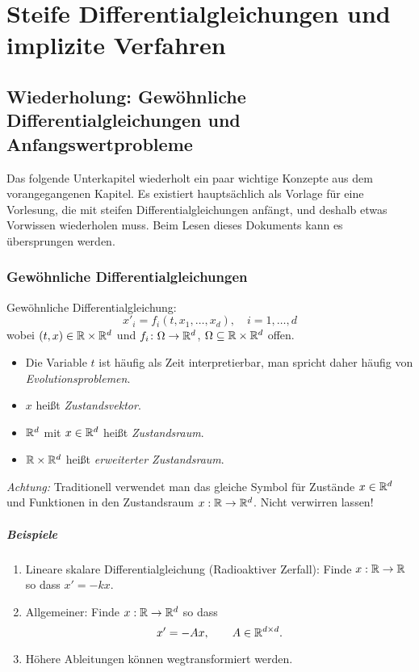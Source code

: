 \chapter{Steife Differentialgleichungen und implizite Verfahren}

\section{Wiederholung: Gewöhnliche Differentialgleichungen und Anfangswertprobleme}

Das folgende Unterkapitel wiederholt ein paar wichtige Konzepte aus dem vorangegangenen
Kapitel.  Es existiert hauptsächlich als Vorlage für eine Vorlesung, die mit steifen
Differentialgleichungen anfängt, und deshalb etwas Vorwissen wiederholen muss.
Beim Lesen dieses Dokuments kann es übersprungen werden.

\bigskip

\subsection{Gewöhnliche Differentialgleichungen}

Gewöhnliche Differentialgleichung:
\begin{equation*}
x'_i=f_i (t,x_1,\ldots,x_d ), \quad i=1,\ldots,d
\end{equation*}
wobei $(t,x) \in \mathbb R \times \mathbb R^d$ und $f_i \colon \Omega \to \mathbb R^d$, $\Omega \subseteq \mathbb R \times \mathbb R^d$ offen.

\begin{itemize}[nolistsep]
	\item Die Variable $t$ ist häufig als Zeit interpretierbar, man spricht daher häufig von \emph{Evolutionsproblemen}.
	\item $x$ heißt \emph{Zustandsvektor}.
	\item $\mathbb R^d$ mit $x \in \mathbb R^d$ heißt \emph{Zustandsraum}.
	\item $\mathbb R \times \mathbb R^d$ heißt \emph{erweiterter Zustandsraum}.
\end{itemize}

\emph{Achtung:} Traditionell verwendet man das gleiche Symbol für Zustände $x \in \mathbb R^d$ und Funktionen in den Zustandsraum $x : \mathbb R \to \mathbb R^d$.  Nicht verwirren lassen!

\paragraph{Beispiele}
\begin{enumerate}
	\item Lineare skalare Differentialgleichung (Radioaktiver Zerfall): Finde $x : \mathbb R \to \mathbb R$ so dass $x' =-kx$. \\
	\item Allgemeiner: Finde $x : \mathbb R \to \mathbb R^d$ so dass
	\begin{equation*}
		x' =-Ax,
		\qquad
		A \in \mathbb R^{d \times d}.
	\end{equation*}
	\item Höhere Ableitungen können wegtransformiert werden.
	\end{enumerate}


